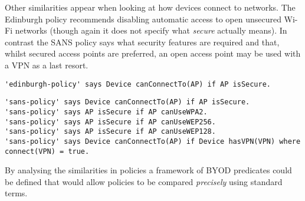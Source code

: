 \documentclass{easychair}
\begin{document}
Other similarities appear when looking at how devices connect to networks.
The Edinburgh policy recommends disabling automatic access to open unsecured Wi-Fi networks (though again it does not specify what \emph{secure} actually means). 
In contrast the SANS policy says what security features are required and that, whilst secured access points are preferred, an open access point may be used with a VPN as a last resort.
\begin{lstlisting}[title={\footnotesize\textbf{Edinburgh}:~\itshape ``Control your devices connections by disabling automatic connection to open, unsecured Wi-Fi networks.''}]
'edinburgh-policy' says Device canConnectTo(AP) if AP isSecure.
\end{lstlisting}
\begin{lstlisting}[title={\footnotesize\textbf{SANS}:~\itshape ``If mobile workers do require connectivity through public, open, or untrusted WLAN, then users MUST use WLANs using, if available and in this order: WPA(2) encryption, WEP 256 bits (or 128 bits), or finally open networks if nothing else is available. Users connected to data networks in an open environment MUST use a VPN connection.''}]
'sans-policy' says Device canConnectTo(AP) if AP isSecure.
'sans-policy' says AP isSecure if AP canUseWPA2.
'sans-policy' says AP isSecure if AP canUseWEP256.
'sans-policy' says AP isSecure if AP canUseWEP128.
'sans-policy' says Device canConnectTo(AP) if Device hasVPN(VPN) where connect(VPN) = true.
\end{lstlisting}
By analysing the similarities in policies a framework of BYOD predicates could be defined that would allow policies to be compared \emph{precisely} using standard terms.
\end{document}
